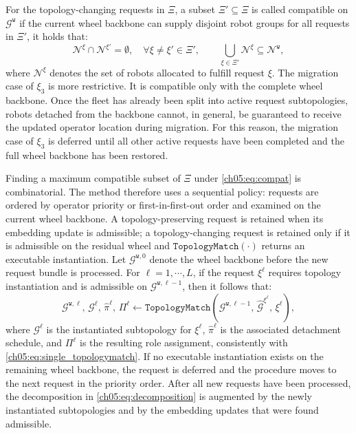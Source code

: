 For the topology-changing requests in \(\Xi\), a subset
\(\Xi' \subseteq \Xi\) is called compatible on
\(\mathcal{G}^{\texttt{w}}\) if the current wheel backbone can supply
disjoint robot groups for all requests in \(\Xi'\), it holds that:
\begin{equation}
\label{ch05:eq:compat}
\mathcal{N}^{\xi}\cap\mathcal{N}^{\xi'}=\emptyset,
\quad \forall \xi\neq\xi'\in\Xi',
\qquad
\bigcup_{\xi\in\Xi'}\mathcal{N}^{\xi}
\subseteq
\mathcal{N}^{\texttt{w}},
\end{equation}
where \(\mathcal{N}^{\xi}\) denotes the set of robots allocated to
fulfill request \(\xi\). The migration case of \(\xi_3\) is more
restrictive. It is compatible only with the complete wheel backbone.
Once the fleet has already been split into active request subtopologies,
robots detached from the backbone cannot, in general, be guaranteed to
receive the updated operator location during migration. For this
reason, the migration case of \(\xi_3\) is deferred until all other
active requests have been completed and the full wheel backbone has
been restored.

Finding a maximum compatible subset of \(\Xi\) under \eqref{ch05:eq:compat} is
combinatorial. The method therefore uses a sequential policy: requests are
ordered by operator priority or first-in-first-out order and examined on the
current wheel backbone. A topology-preserving request is retained when its
embedding update is admissible; a topology-changing request is retained only if
it is admissible on the residual wheel and \(\texttt{TopologyMatch}(\cdot)\)
returns an executable instantiation.
Let \(\mathcal{G}^{\texttt{w},0}\) denote the wheel backbone before
the new request bundle is processed. For \(\ell=1,\cdots,L\), if the
request \(\xi^{\ell}\) requires topology instantiation and is admissible
on \(\mathcal{G}^{\texttt{w},\ell-1}\), then it follows that:
\begin{equation}
\label{ch05:eq:combinatorial}
\mathcal{G}^{\texttt{w},\ell},\,
\mathcal{G}^{\ell},\,
\widehat{\pi}^{\ell},\,
\Pi^{\ell}
\leftarrow
\texttt{TopologyMatch}\!\left(
\mathcal{G}^{\texttt{w},\ell-1},\,
\widehat{\mathcal{G}}^{\xi^{\ell}},\,
\xi^{\ell}
\right),
\end{equation}
where \(\mathcal{G}^{\ell}\) is the instantiated subtopology for
\(\xi^{\ell}\), \(\widehat{\pi}^{\ell}\) is the associated
detachment schedule, and \(\Pi^{\ell}\) is the resulting role
assignment, consistently with \eqref{ch05:eq:single_topologymatch}.
 If no
executable instantiation exists on the remaining wheel backbone, the
request is deferred and the procedure moves to the next request in the
priority order. After all new requests have been processed, the
decomposition in \eqref{ch05:eq:decomposition} is augmented by the
newly instantiated subtopologies and by the embedding updates that were
found admissible.

